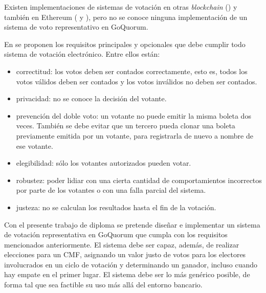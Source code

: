 Existen implementaciones de sistemas de votaci\'on en otras \textit{blockchain} (\cite{agora}) y tambi\'en en Ethereum (\cite{ovn} y \cite{borda_count}), pero no se conoce ninguna implementaci\'on de un sistema de voto representativo en GoQuorum.


En \cite{wang2017review} se proponen los requisitos principales y opcionales que debe cumplir todo sistema de votaci\'on electr\'onico. Entre ellos est\'an:
\begin{itemize}
    \item correctitud: los votos deben ser contados correctamente, esto es, todos los votos v\'alidos deben ser contados y los votos inv\'alidos no deben ser contados.

    \item privacidad: no se conoce la decisi\'on del votante.

    \item prevenci\'on del doble voto: un votante no puede emitir la misma boleta dos veces. También se debe evitar que un tercero pueda clonar una boleta previamente emitida por un votante, para registrarla de nuevo a nombre de ese votante.

    \item elegibilidad: s\'olo los votantes autorizados pueden votar.

    \item robustez: poder lidiar con una cierta cantidad de comportamientos incorrectos por parte de los votantes o con una falla parcial del sistema.

    \item justeza: no se calculan los resultados hasta el fin de la votaci\'on.

\end{itemize}

Con el presente trabajo de diploma  se pretende dise\~nar e implementar un sistema de votaci\'on representativa en GoQuorum que cumpla con los requisitos mencionados anteriormente. El sistema debe ser capaz, adem\'as, de realizar elecciones para un CMF, asignando un valor justo de votos para los electores involucrados en un ciclo de votaci\'on y determinando un ganador, incluso cuando hay empate en el primer lugar. El sistema debe ser lo m\'as gen\'erico posible, de forma tal que sea factible su uso m\'as all\'a del entorno bancario.






